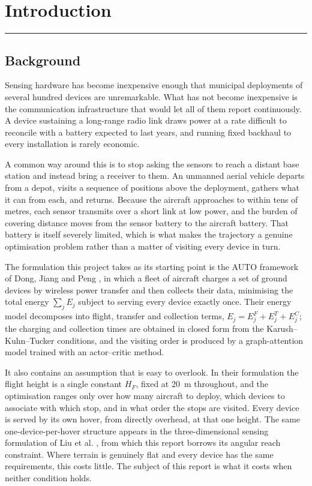 \chapter{Introduction}
\label{chap:intro}
\noindent \rule{6.6in}{0.01in}
\minitoc
\newpage

\section{Background}

Sensing hardware has become inexpensive enough that municipal deployments of several hundred devices are unremarkable. What has not become inexpensive is the communication infrastructure that would let all of them report continuously. A device sustaining a long-range radio link draws power at a rate difficult to reconcile with a battery expected to last years, and running fixed backhaul to every installation is rarely economic.

A common way around this is to stop asking the sensors to reach a distant base station and instead bring a receiver to them. An unmanned aerial vehicle departs from a depot, visits a sequence of positions above the deployment, gathers what it can from each, and returns. Because the aircraft approaches to within tens of metres, each sensor transmits over a short link at low power, and the burden of covering distance moves from the sensor battery to the aircraft battery. That battery is itself severely limited, which is what makes the trajectory a genuine optimisation problem rather than a matter of visiting every device in turn.

The formulation this project takes as its starting point is the AUTO framework of Dong, Jiang and Peng \cite{paperA}, in which a fleet of aircraft charges a set of ground devices by wireless power transfer and then collects their data, minimising the total energy $\sum_j E_j$ subject to serving every device exactly once. Their energy model decomposes into flight, transfer and collection terms, $E_j = E^F_j + E^T_j + E^C_j$; the charging and collection times are obtained in closed form from the Karush--Kuhn--Tucker conditions, and the visiting order is produced by a graph-attention model trained with an actor--critic method.

It also contains an assumption that is easy to overlook. In their formulation the flight height is a single constant $H_F$, fixed at $20$~m throughout, and the optimisation ranges only over how many aircraft to deploy, which devices to associate with which stop, and in what order the stops are visited. Every device is served by its own hover, from directly overhead, at that one height. The same one-device-per-hover structure appears in the three-dimensional sensing formulation of Liu et al. \cite{paperB}, from which this report borrows its angular reach constraint. Where terrain is genuinely flat and every device has the same requirements, this costs little. The subject of this report is what it costs when neither condition holds.

